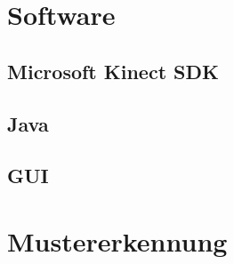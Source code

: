 \section{Software}

\subsection{Microsoft Kinect SDK}
\subsection{Java}

\subsection{GUI}

\section{Mustererkennung}
